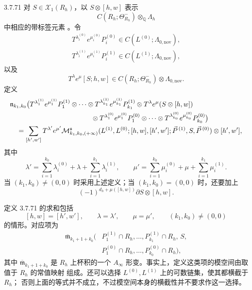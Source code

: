 \begin{definition}{3.7.71}\label{def:3-7-71}
对 $S\in\mathcal X_1(R_h)$，以 $S\otimes[h,w]$ 表示
\[
 C(R_h;\Theta^-_{R_h})\otimes_{\mathbb Q}\Lambda_h
\]
中相应的带标签元素
。令
\[
\begin{gathered}
 T^{\lambda_i^{(0)}}e^{\mu_i^{(0)}}P_i^{(0)}
 \in C(L^{(0)};\Lambda_{0,\mathrm{nov}}),\\
 T^{\lambda_i^{(1)}}e^{\mu_i^{(1)}}P_i^{(1)}
 \in C(L^{(1)};\Lambda_{0,\mathrm{nov}}),
\end{gathered}
\]
以及
\[
 T^\lambda e^\mu[S;h,w]
 \in C(R_h;\Theta^-_{R_h})\otimes\Lambda_{0,\mathrm{nov}}.
\]
定义
\[
\begin{aligned}
 &\mathfrak n_{k_1,k_0}
 \bigl(
 T^{\lambda_1^{(1)}}e^{\mu_1^{(1)}}P_1^{(1)}
 \otimes\cdots\otimes
 T^{\lambda_{k_1}^{(1)}}e^{\mu_{k_1}^{(1)}}P_{k_1}^{(1)}
 \otimes T^\lambda e^\mu(S\otimes[h,w])\\
 &\hspace{42mm}\otimes
 T^{\lambda_1^{(0)}}e^{\mu_1^{(0)}}P_1^{(0)}
 \otimes\cdots\otimes
 T^{\lambda_{k_0}^{(0)}}e^{\mu_{k_0}^{(0)}}P_{k_0}^{(0)}
 \bigr)\\
 &\quad=
 \sum_{[h',w']}
 T^{\lambda'}e^{\mu'}
 \mathcal M^{\mathfrak s}_{k_1,k_0,(+\infty)}
 (L^{(1)},L^{(0)};[h,w],[h',w'];
 \vec P^{\,(1)},S,\vec P^{\,(0)})
 \otimes[h',w'],
\end{aligned}
\]
其中
\[
 \lambda'
 =\sum_{i=1}^{k_0}\lambda_i^{(0)}
 +\lambda+\sum_{i=1}^{k_1}\lambda_i^{(1)},
 \qquad
 \mu'
 =\sum_{i=1}^{k_0}\mu_i^{(0)}
 +\mu+\sum_{i=1}^{k_1}\mu_i^{(1)}.
\]
当 $(k_1,k_0)\ne(0,0)$ 时采用上述定义；当
$(k_1,k_0)=(0,0)$ 时，还要加上
\[
 (-1)^{d_h+\mu([h,w])}\partial S\otimes[h,w].
\]
\end{definition}

定义 3.7.71 的求和包括
\[
 [h,w]=[h',w'],\qquad
 \lambda=\lambda',\qquad
 \mu=\mu',\qquad
 (k_1,k_0)\ne(0,0)
\]
的情形。对应项为
\[
\begin{aligned}
 \overline{\mathfrak m}_{k_1+1+k_0}
 \bigl(&P_1^{(1)}\cap R_h,\ldots,P_{k_1}^{(1)}\cap R_h,\,
 S,\\
 &P_1^{(0)}\cap R_h,\ldots,P_{k_0}^{(0)}\cap R_h\bigr),
\end{aligned}
\]
其中 $\overline{\mathfrak m}_{k_1+1+k_0}$ 是 $R_h$ 上杯积的一个
$A_\infty$ 形变。事实上，定义这类项的模空间由取值于 $R_h$ 的常值映射
组成。还可以选择 $L^{(0)},L^{(1)}$ 上的可数链集，使其都横截于 $R_h$；
否则上面的等式并不成立，不过模空间本身的横截性并不要求作这一选择。


